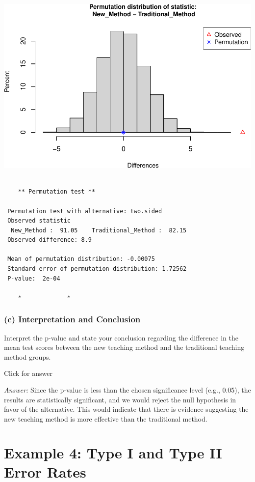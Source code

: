 \documentclass[
]{book}
\begin{document}
\includegraphics[width=1\linewidth]{Class_Activity_13_files/figure-latex/unnamed-chunk-2-1}

\begin{verbatim}

    ** Permutation test **

 Permutation test with alternative: two.sided 
 Observed statistic
  New_Method :  91.05    Traditional_Method :  82.15 
 Observed difference: 8.9 

 Mean of permutation distribution: -0.00075 
 Standard error of permutation distribution: 1.72562 
 P-value:  2e-04 

    *-------------*
\end{verbatim}

\hypertarget{c-interpretation-and-conclusion-1}{%
\subsubsection{(c) Interpretation and Conclusion}\label{c-interpretation-and-conclusion-1}}

Interpret the p-value and state your conclusion regarding the difference in the mean test scores between the new teaching method and the traditional teaching method groups.

Click for answer

\emph{Answer:} Since the p-value is less than the chosen significance level (e.g., 0.05), the results are statistically significant, and we would reject the null hypothesis in favor of the alternative. This would indicate that there is evidence suggesting the new teaching method is more effective than the traditional method.

\hypertarget{example-4-type-i-and-type-ii-error-rates}{%
\section{Example 4: Type I and Type II Error Rates}\label{example-4-type-i-and-type-ii-error-rates}}
\end{document}
